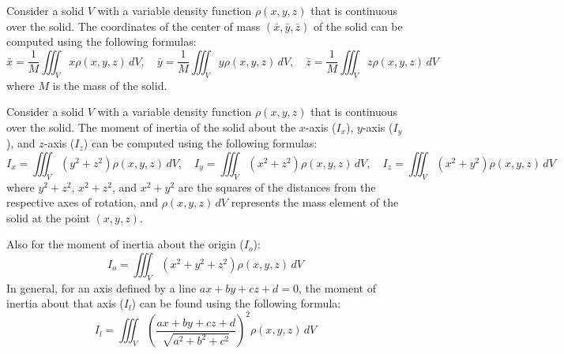 \documentclass[11pt]{report}
\begin{document}
\begin{definition}
    Consider a solid $V$ with a variable density function $\rho(x,y,z)$ that is continuous over the solid. The coordinates of the center of mass $(\bar{x}, \bar{y}, \bar{z})$ of the solid can be computed using the following formulas:
    \begin{equation}
        \bar{x} = \frac{1}{M} \iiint_V x \rho(x,y,z) \, dV, \quad \bar{y} = \frac{1}{M} \iiint_V y \rho(x,y,z) \, dV, \quad \bar{z} = \frac{1}{M} \iiint_V z \rho(x,y,z) \, dV
    \end{equation}
    where $M$ is the mass of the solid.
    
\end{definition}


\begin{definition}
    Consider a solid $V$ with a variable density function $\rho(x,y,z)$ that is continuous over the solid. The moment of inertia of the solid about the $x$-axis ($I_x$), $y$-axis ($I_y$), and $z$-axis ($I_z$) can be computed using the following formulas:
    \begin{equation}
        I_x = \iiint_V (y^2 + z^2) \rho(x,y,z) \, dV, \quad I_y = \iiint_V (x^2 + z^2) \rho(x,y,z) \, dV, \quad I_z = \iiint_V (x^2 + y^2) \rho(x,y,z) \, dV
    \end{equation}
    where $y^2 + z^2$, $x^2 + z^2$, and $x^2 + y^2$ are the squares of the distances from the respective axes of rotation, and $\rho(x,y,z) \, dV$ represents the mass element of the solid at the point $(x,y,z)$.

    Also for the moment of inertia about the origin ($I_o$):
    \begin{equation}
        I_o = \iiint_V (x^2 + y^2 + z^2) \rho(x,y,z) \, dV
    \end{equation}
    In general, for an axis defined by a line $ax + by + cz + d = 0$, the moment of inertia about that axis ($I_l$) can be found using the following formula:
    \begin{equation}
        I_l = \iiint_V \left( \frac{ax + by + cz + d}{\sqrt{a^2 + b^2 + c^2}} \right)^2 \rho(x,y,z) \, dV
    \end{equation}
\end{definition}
\end{document}
